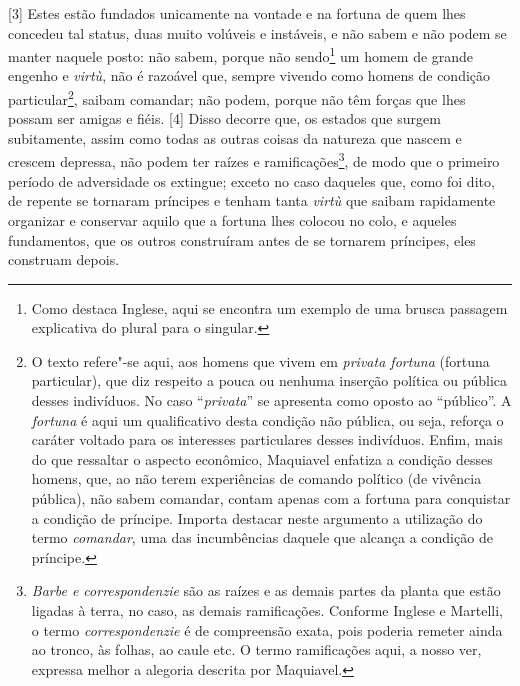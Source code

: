 {[}3{]} Estes estão fundados unicamente na vontade e na fortuna de quem
lhes concedeu tal status, duas muito volúveis e instáveis, e não sabem e
não podem se manter naquele posto: não sabem, porque não sendo\footnote{Como
  destaca Inglese, aqui se encontra um exemplo de uma brusca passagem
  explicativa do plural para o singular.} um homem de grande engenho e
\emph{virtù}, não é razoável que, sempre vivendo como homens de condição
particular\footnote{O texto refere"-se aqui, aos homens que vivem em
  \emph{privata fortuna} (fortuna particular), que diz respeito a pouca
  ou nenhuma inserção política ou pública desses indivíduos. No caso
  ``\emph{privata}'' se apresenta como oposto ao ``público''. A
  \emph{fortuna} é aqui um qualificativo desta condição não pública, ou
  seja, reforça o caráter voltado para os interesses particulares desses
  indivíduos. Enfim, mais do que ressaltar o aspecto econômico,
  Maquiavel enfatiza a condição desses homens, que, ao não terem
  experiências de comando político (de vivência pública), não sabem
  comandar, contam apenas com a fortuna para conquistar a condição de
  príncipe. Importa destacar neste argumento a utilização do termo
  \emph{comandar}, uma das incumbências daquele que alcança a condição
  de príncipe.}, saibam comandar; não podem, porque não têm forças que
lhes possam ser amigas e fiéis. {[}4{]} Disso decorre que, os estados
que surgem subitamente, assim como todas as outras coisas da natureza
que nascem e crescem depressa, não podem ter raízes e
ramificações\footnote{\emph{Barbe e correspondenzie} são as raízes e as
  demais partes da planta que estão ligadas à terra, no caso, as demais
  ramificações. Conforme Inglese e Martelli, o termo
  \emph{correspondenzie} é de compreensão exata, pois poderia remeter
  ainda ao tronco, às folhas, ao caule etc. O termo ramificações aqui, a
  nosso ver, expressa melhor a alegoria descrita por Maquiavel.}, de
modo que o primeiro período de adversidade os extingue; exceto no caso
daqueles que, como foi dito, de repente se tornaram príncipes e tenham
tanta \emph{virtù} que saibam rapidamente organizar e conservar aquilo
que a fortuna lhes colocou no colo, e aqueles fundamentos, que os outros
construíram antes de se tornarem príncipes, eles construam depois.

